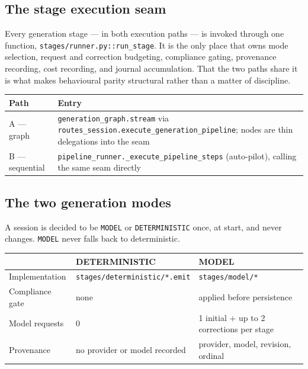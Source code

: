 \documentclass[11pt,a4paper]{article}
\begin{document}
\subsection{The stage execution seam}

Every generation stage --- in both execution paths --- is invoked through one
function, \texttt{stages/runner.py::run\_stage}. It is the only place that owns mode
selection, request and correction budgeting, compliance gating, provenance
recording, cost recording, and journal accumulation. That the two paths share it is
what makes behavioural parity structural rather than a matter of discipline.

\begin{center}
\begin{tabular}{@{}p{}p{}@{}}
\toprule
\textbf{Path} & \textbf{Entry} \\
\midrule
A --- graph & \texttt{generation\_graph.stream} via
\texttt{routes\_session.execute\_generation\_pipeline}; nodes are thin delegations
into the seam \\
B --- sequential & \texttt{pipeline\_runner.\_execute\_pipeline\_steps} (auto-pilot),
calling the same seam directly \\
\bottomrule
\end{tabular}
\end{center}

\subsection{The two generation modes}

A session is decided to be \texttt{MODEL} or \texttt{DETERMINISTIC} once, at start,
and never changes. \texttt{MODEL} never falls back to deterministic.

\begin{center}
\begin{tabular}{@{}lll@{}}
\toprule
& \textbf{DETERMINISTIC} & \textbf{MODEL} \\
\midrule
Implementation & \texttt{stages/deterministic/*.emit} & \texttt{stages/model/*} \\
Compliance gate & none & applied before persistence \\
Model requests & 0 & 1 initial $+$ up to 2 corrections per stage \\
Provenance & no provider or model recorded & provider, model, revision, ordinal \\
\bottomrule
\end{tabular}
\end{center}
\end{document}
